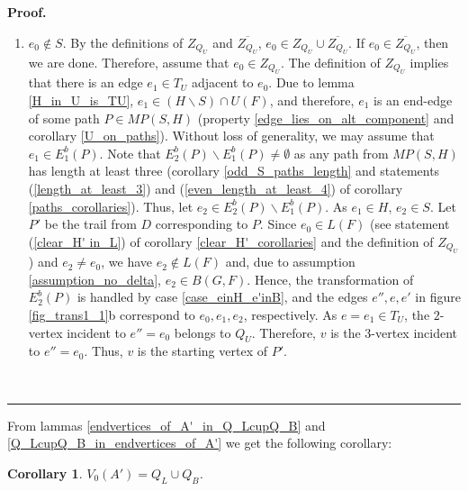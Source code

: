 \documentclass[a4paper, 12pt]{article}
\newtheorem{corollary}[lemma]{Corollary}
\newenvironment{proof}[1][Proof]{\noindent\textbf{#1.} }{\ \rule{0.5em}{0.5em}}
\begin{document}
\begin{proof}
\begin{enumerate}
\item \textbf{$e_0 \notin S$}. By the definitions of $Z_{Q_U}$ and $\overline{Z_{Q_U}}$, $e_0 \in Z_{Q_U} \cup
\overline{Z_{Q_U}}$. If $e_0 \in \overline{Z_{Q_U}}$, then we are
done. Therefore, assume that $e_0 \in Z_{Q_U}$. The definition of
$Z_{Q_U}$ implies that there is an edge $e_1 \in T_U$ adjacent to
$e_0$. Due to lemma \ref{H_in_U_is_TU}, $e_1 \in (H \backslash S)
\cap U(F)$, and therefore, $e_1$ is an end-edge of some path $P \in
MP(S,H)$ (property \ref{edge_lies_on_alt_component} and corollary
\ref{U_on_paths}). Without loss of generality, we may assume that
$e_1 \in E_1^b(P)$. Note that $E_2^b(P) \backslash E_1^b(P) \neq
\emptyset$ as any path from $MP(S,H)$ has length at least three
(corollary \ref{odd_S_paths_length} and statements
(\ref{length_at_least_3}) and (\ref{even_length_at_least_4}) of
corollary \ref{paths_corollaries}). Thus, let $e_2 \in E_2^b(P)
\backslash E_1^b(P)$. As $e_1 \in H$, $e_2 \in S$. Let $P'$ be the
trail from $D$ corresponding to $P$. Since $e_0 \in L(F)$ (see
statement (\ref{clear_H' in_L}) of corollary
\ref{clear_H'_corollaries} and the definition of $Z_{Q_U}$) and $e_2
\neq e_0$, we have $e_2 \notin L(F)$ and, due to assumption
\ref{assumption_no_delta}, $e_2 \in B(G,F)$. Hence, the
transformation of $E_2^b(P)$ is handled by case
\ref{case_einH_e'inB}, and the edges $e'', e, e'$ in figure
\ref{fig_trans1_1}b correspond to $e_0, e_1, e_2$, respectively. As
$e=e_1 \in T_U$, the $2$-vertex incident to $e''=e_0$ belongs to
$Q_U$. Therefore, $v$ is the $3$-vertex incident to $e''=e_0$. Thus,
$v$ is the starting vertex of $P'$.
\end{enumerate}
\end{proof}

\bigskip

From lammas \ref{endvertices_of_A'_in_Q_LcupQ_B} and
\ref{Q_LcupQ_B_in_endvertices_of_A'} we get the following corollary:
\begin{corollary}\label{V_0=Q_LcupQ_B}
$V_0(A') = Q_L \cup Q_B$.
\end{corollary}

\bigskip
\end{document}
